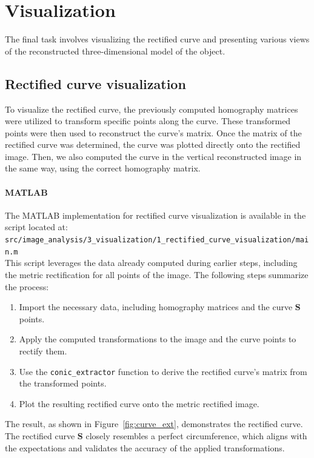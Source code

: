\documentclass{Academic}
\begin{document}
\section{Visualization}
The final task involves visualizing the rectified curve and presenting various views of the reconstructed three-dimensional model of the object.

\subsection{Rectified curve visualization}
To visualize the rectified curve, the previously computed homography matrices were utilized to transform specific points along the curve. 
These transformed points were then used to reconstruct the curve's matrix. 
Once the matrix of the rectified curve was determined, the curve was plotted directly onto the rectified image.
Then, we also computed the curve in the vertical reconstructed image in the same way, using the correct homography matrix. 

\paragraph*{MATLAB}
The MATLAB implementation for rectified curve visualization is available in the script located at: \\ 
\texttt{src/image\_analysis/3\_visualization/1\_rectified\_curve\_visualization/main.m} \\
This script leverages the data already computed during earlier steps, including the metric rectification for all points of the image. The following steps summarize the process:
\begin{enumerate}
    \item Import the necessary data, including homography matrices and the curve $\mathbf{S}$ points.
    \item Apply the computed transformations to the image and the curve points to rectify them.
    \item Use the \texttt{conic\_extractor} function to derive the rectified curve’s matrix from the transformed points.
    \item Plot the resulting rectified curve onto the metric rectified image.
\end{enumerate}
The result, as shown in Figure~\ref{fig:curve_ext}, demonstrates the rectified curve.
The rectified curve $\mathbf{S}$ closely resembles a perfect circumference, which aligns with the expectations and validates the accuracy of the applied transformations.
\end{document}
